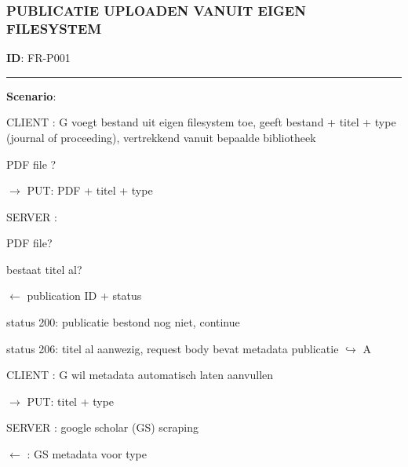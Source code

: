 \documentclass{article}
\begin{document}
\subsubsection*{PUBLICATIE UPLOADEN VANUIT EIGEN FILESYSTEM}
\vspace{2 mm}

\textbf{ID}: FR-P001
\vspace{2 mm}



\hrule
\vspace{2 mm}
\noindent \textbf{Scenario}:
\begin{description}
\item CLIENT : G voegt bestand uit eigen filesystem toe, geeft bestand + titel + type (journal of proceeding), vertrekkend vanuit bepaalde bibliotheek
	\begin{description}
	\item \checkmark PDF file ? 
	\item $\rightarrow$ PUT: PDF + titel + type 
	\end{description}
	
\item SERVER : 
	\begin{description}
	\item \checkmark PDF file?
	\item \checkmark bestaat titel al? 
	\item $\leftarrow$ publication ID + status 
		\begin{description}
		\item status 200: publicatie bestond nog niet, continue 
		\item status 206: titel al aanwezig, request body bevat metadata publicatie  $\hookrightarrow$ A
		\end{description}
	\end{description}
	
\item CLIENT :  G wil metadata automatisch laten aanvullen
	\begin{description}
	\item $\rightarrow$ PUT:  titel  + type
	\end{description}
	
\item SERVER :  google scholar (GS) scraping
	\begin{description}
	\item $\leftarrow$ :    GS metadata voor type
	\end{description}
	

\end{description}
\end{document}
